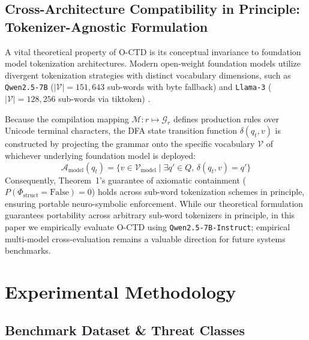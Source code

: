 \documentclass[preprint,12pt,3p]{elsarticle}
\begin{document}
\subsection{Cross-Architecture Compatibility in Principle: Tokenizer-Agnostic Formulation}

A vital theoretical property of O-CTD is its conceptual invariance to foundation model tokenization architectures. Modern open-weight foundation models utilize divergent tokenization strategies with distinct vocabulary dimensions, such as \texttt{Qwen2.5-7B} ($|\mathcal{V}| = 151,643$ sub-words with byte fallback) \cite{tang2024tool} and \texttt{Llama-3} ($|\mathcal{V}| = 128,256$ sub-words via tiktoken) \cite{zhao2024evaluating}.

Because the compilation mapping $\mathcal{M}: r \mapsto \mathcal{G}_r$ defines production rules over Unicode terminal characters, the DFA state transition function $\delta(q_t, v)$ is constructed by projecting the grammar onto the specific vocabulary $\mathcal{V}$ of whichever underlying foundation model is deployed:
\begin{equation}
    \mathcal{A}_{\text{model}}(q_t) = \{ v \in \mathcal{V}_{\text{model}} \mid \exists q' \in Q, \, \delta(q_t, v) = q' \}
\end{equation}
Consequently, Theorem~1's guarantee of axiomatic containment ($P(\Phi_{\text{struct}} = \text{False}) = 0$) holds across sub-word tokenization schemes in principle, ensuring portable neuro-symbolic enforcement. While our theoretical formulation guarantees portability across arbitrary sub-word tokenizers in principle, in this paper we empirically evaluate O-CTD using \texttt{Qwen2.5-7B-Instruct}; empirical multi-model cross-evaluation remains a valuable direction for future systems benchmarks.

\section{Experimental Methodology}
\label{sec:exp}

\subsection{Benchmark Dataset \& Threat Classes}
\end{document}
